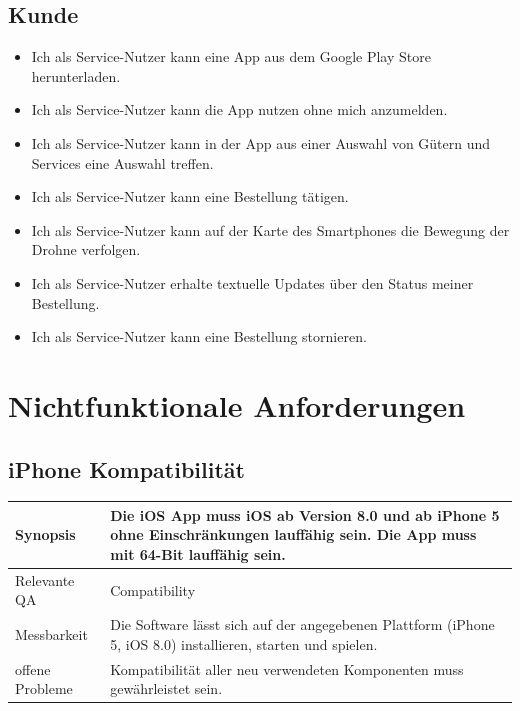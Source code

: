 \subsection{Kunde}
\begin{itemize}
\item Ich als Service-Nutzer kann eine App aus dem Google Play Store herunterladen.
\item Ich als Service-Nutzer kann die App nutzen ohne mich anzumelden.
\item Ich als Service-Nutzer kann in der App aus einer Auswahl von Gütern und Services eine Auswahl treffen.
\item Ich als Service-Nutzer kann eine Bestellung tätigen.
\item Ich als Service-Nutzer kann auf der Karte des Smartphones die Bewegung der Drohne verfolgen.
\item Ich als Service-Nutzer erhalte textuelle Updates über den Status meiner Bestellung.
\item Ich als Service-Nutzer kann eine Bestellung stornieren.
\end{itemize}

\section{Nichtfunktionale Anforderungen}

\subsection{iPhone Kompatibilität}
\begin{tabular}{|p{}|p{}|} \hline
	Synopsis & Die iOS App muss iOS ab Version 8.0 und ab iPhone 5 ohne Einschränkungen lauffähig sein. Die App muss mit 64-Bit lauffähig sein. \\ \hline
	Relevante QA & Compatibility   \\ \hline
	Messbarkeit & Die Software lässt sich auf der angegebenen Plattform (iPhone 5, iOS 8.0) installieren, starten und spielen. \\ \hline
	offene Probleme & Kompatibilität aller neu verwendeten Komponenten muss gewährleistet sein.  \\ \hline
\end{tabular}


